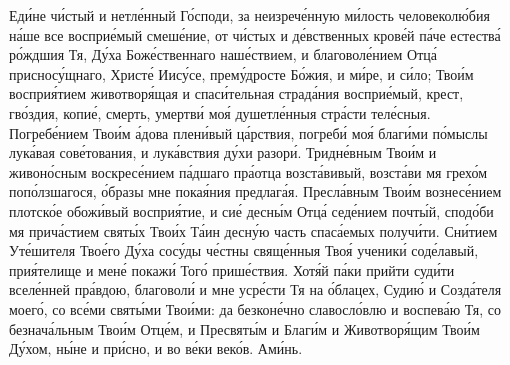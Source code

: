 \begin{mymulticols}

Ед\'{и}не ч\'{и}стый и нетл\'{е}нный Г\'{о}споди, за неизреч\'{е}нную м\'{и}лость человекол\'{ю}бия н\'{а}ше все воспри\'{е}мый смеш\'{е}ние, от ч\'{и}стых и д\'{е}вственных кров\'{е}й п\'{а}че естеств\'{а} р\'{о}ждшия Тя, Д\'{у}ха Бож\'{е}ственнаго наш\'{е}ствием, и благовол\'{е}нием Отц\'{а} приснос\'{у}щнаго, Христ\'{е} Иис\'{у}се, прем\'{у}дросте Б\'{о}жия, и м\'{и}ре, и с\'{и}ло; Тво\'{и}м воспри\'{я}тием животвор\'{я}щая и спас\'{и}тельная страд\'{а}ния воспри\'{е}мый, крест, гв\'{о}здия, копи\'{е}, смерть, умертв\'{и} мо\'{я} душетл\'{е}нныя стр\'{а}сти тел\'{е}сныя. Погреб\'{е}нием Тво\'{и}м \'{а}дова плен\'{и}вый ц\'{а}рствия, погреб\'{и} мо\'{я} благ\'{и}ми п\'{о}мыслы лук\'{а}вая сов\'{е}тования, и лук\'{а}вствия д\'{у}хи разор\'{и}. Тридн\'{е}вным Тво\'{и}м и живон\'{о}сным воскрес\'{е}нием п\'{а}дшаго пр\'{а}отца возст\'{а}вивый, возст\'{а}ви мя грех\'{о}м поп\'{о}лзшагося, \'{о}бразы мне пока\'{я}ния предлаг\'{а}я. Пресл\'{а}вным Тво\'{и}м вознес\'{е}нием плотск\'{о}е обож\'{и}вый воспри\'{я}тие, и си\'{е} десн\'{ы}м Отц\'{а} сед\'{е}нием почт\'{ы}й, спод\'{о}би мя прич\'{а}стием свят\'{ы}х Тво\'{и}х Т\'{а}ин десн\'{у}ю часть спас\'{а}емых получ\'{и}ти. Сн\'{и}тием Ут\'{е}шителя Тво\'{е}го Д\'{у}ха сос\'{у}ды ч\'{е}стны свящ\'{е}нныя Тво\'{я} ученик\'{и} сод\'{е}лавый, при\'{я}телище и мен\'{е} покаж\'{и} Тог\'{о} приш\'{е}ствия. Хот\'{я}й п\'{а}ки прийти суд\'{и}ти всел\'{е}нней пр\'{а}вдою, благовол\'{и} и мне уср\'{е}сти Тя на \'{о}блацех, Суди\'{ю} и Созд\'{а}теля моег\'{о}, со вс\'{е}ми свят\'{ы}ми Тво\'{и}ми: да безкон\'{е}чно славосл\'{о}влю и воспев\'{а}ю Тя, со безнач\'{а}льным Тво\'{и}м Отц\'{е}м, и Пресвят\'{ы}м и Благ\'{и}м и Животвор\'{я}щим Тво\'{и}м Д\'{у}хом, н\'{ы}не и пр\'{и}сно, и во в\'{е}ки век\'{о}в. Ам\'{и}нь.


\end{mymulticols}
